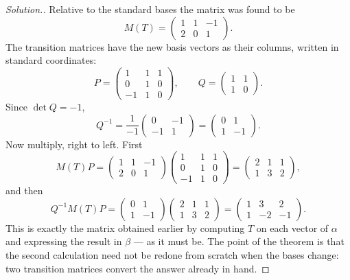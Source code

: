 \documentclass[11pt,a4paper]{article}
\theoremstyle{definition}
\newenvironment{solution}
  {\renewcommand{\qedsymbol}{}\begin{proof}[\textit{Solution}.]}
  {\end{proof}}
\begin{document}
\begin{solution}
Relative to the standard bases the matrix was found to be
$$M(T)=\begin{pmatrix}1&1&-1\\2&0&1\end{pmatrix}.$$
The transition matrices have the new basis vectors as their columns, written in
standard coordinates:
$$P=\begin{pmatrix}1&1&1\\0&1&0\\-1&1&0\end{pmatrix},\qquad
  Q=\begin{pmatrix}1&1\\1&0\end{pmatrix}.$$
Since $\det Q=-1$,
$$Q^{-1}=\frac{1}{-1}\begin{pmatrix}0&-1\\-1&1\end{pmatrix}
=\begin{pmatrix}0&1\\1&-1\end{pmatrix}.$$
Now multiply, right to left. First
$$M(T)P=\begin{pmatrix}1&1&-1\\2&0&1\end{pmatrix}
\begin{pmatrix}1&1&1\\0&1&0\\-1&1&0\end{pmatrix}
=\begin{pmatrix}2&1&1\\1&3&2\end{pmatrix},$$
and then
$$Q^{-1}M(T)P=\begin{pmatrix}0&1\\1&-1\end{pmatrix}
\begin{pmatrix}2&1&1\\1&3&2\end{pmatrix}
=\begin{pmatrix}1&3&2\\1&-2&-1\end{pmatrix}.$$
This is exactly the matrix obtained earlier by computing $T$ on each vector of
$\alpha$ and expressing the result in $\beta$ --- as it must be. The point of
the theorem is that the second calculation need not be redone from scratch when
the bases change: two transition matrices convert the answer already in hand.
\end{solution}
\end{document}

